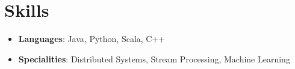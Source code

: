 \documentclass[letterpaper,11pt]{article}
\newcommand{\resumeItem}[2]{
  \item\small{
    \textbf{#1}{: #2 \vspace{-2pt}}
  }
}
\newcommand{\resumeSubItem}[2]{\resumeItem{#1}{#2}\vspace{-4pt}}
\newcommand{\resumeSubHeadingListStart}{\begin{itemize}[leftmargin=*]}
\newcommand{\resumeSubHeadingListEnd}{\end{itemize}}
\begin{document}

%
\section{Skills}
\resumeSubHeadingListStart
\item
\textbf{Languages}{: Java, Python, Scala, C++}
\item \vspace{-5pt}
\textbf{Specialities}{: Distributed Systems, Stream Processing, Machine Learning}
\resumeSubHeadingListEnd


\end{document}
